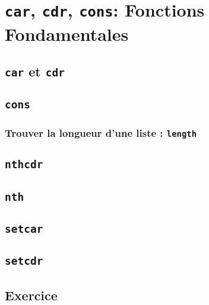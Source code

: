 \chapter{\texttt{car}, \texttt{cdr}, \texttt{cons}: Fonctions
  Fondamentales}

\section{\texttt{car} et \texttt{cdr}}

\section{\texttt{cons}}

\subsection{Trouver la longueur d'une liste :
  \texttt{length}}

\section{\texttt{nthcdr}}

\section{\texttt{nth}}

\section{\texttt{setcar}}

\section{\texttt{setcdr}}

\section{Exercice}